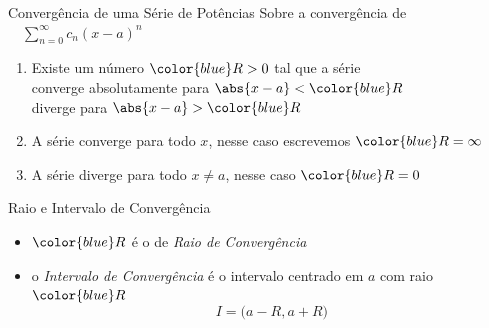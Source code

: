 \documentclass[fleqn,utf8,aspectratio=169,12pt]{beamer}
\begin{document}
%
%
%
%

\begin{frame}{Convergência de uma Série de Potências}
  Sobre a convergência de
  \(\quad\sum_{n=0}^\infty c_n(x-a)^n\quad\)

  \pause
  \vspace{\baselineskip}
  \begin{enumerate}[<+->]
    \item Existe um número ${\color{blue}R>0}$ tal que a série \\[1mm]
          \tabto{10mm} converge absolutamente para \tabto{70mm} \(\abs{x-a}<{\color{blue}R}\) \\
          \tabto{10mm} diverge para                \tabto{70mm} \(\abs{x-a}>{\color{blue}R}\)
    \vspace{\baselineskip}
    \item A série converge para todo $x$, nesse caso escrevemos ${\color{blue}R=\infty}$
    \vspace{\baselineskip}
    \item A série diverge para todo $x\neq a$, nesse caso ${\color{blue}R=0}$
  \end{enumerate}
\end{frame}

\begin{frame}{Raio e Intervalo de Convergência}
  \begin{itemize}[<+->]
    \item \({\color{blue}R}\) é o de \emph{Raio de Convergência} \\[\baselineskip]
    \item o \emph{Intervalo de Convergência} é o intervalo centrado em \(a\) com raio ${\color{blue}R}$
          \[
            I = \big( a-R, a+R \big)
          \]
  \end{itemize}

\end{frame}
\end{document}
